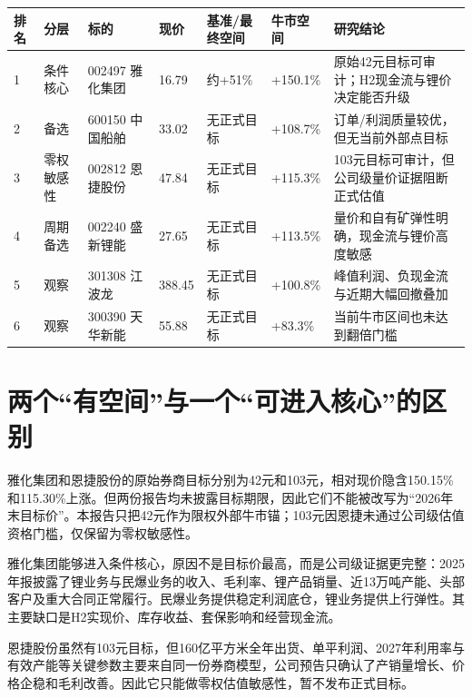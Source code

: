 \begin{exhibitbox}
\small
\begin{tabularx}{\exhibitboxwidth}{C{0.8cm} L{1.7cm} L{2.4cm} R{1.35cm} R{1.35cm} R{1.35cm} X}
\toprule
排名 & 分层 & 标的 & 现价 & 基准/最终空间 & 牛市空间 & 研究结论 \\
 & 条件核心 & 002497 雅化集团 & 16.79 & 约+51\% & +150.1\% & 原始42元目标可审计；H2现金流与锂价决定能否升级 \\
2 & 备选 & 600150 中国船舶 & 33.02 & 无正式目标 & +108.7\% & 订单/利润质量较优，但无当前外部点目标 \\
3 & 零权敏感性 & 002812 恩捷股份 & 47.84 & 无正式目标 & +115.3\% & 103元目标可审计，但公司级量价证据阻断正式估值 \\
4 & 周期备选 & 002240 盛新锂能 & 27.65 & 无正式目标 & +113.5\% & 量价和自有矿弹性明确，现金流与锂价高度敏感 \\
5 & 观察 & 301308 江波龙 & 388.45 & 无正式目标 & +100.8\% & 峰值利润、负现金流与近期大幅回撤叠加 \\
6 & 观察 & 300390 天华新能 & 55.88 & 无正式目标 & +83.3\% & 当前牛市区间也未达到翻倍门槛 \\
\bottomrule
\end{tabularx}
\end{exhibitbox}

\section{两个“有空间”与一个“可进入核心”的区别}

雅化集团和恩捷股份的原始券商目标分别为42元和103元，相对现价隐含150.15\%和115.30\%上涨。但两份报告均未披露目标期限，因此它们不能被改写为“2026年末目标价”。本报告只把42元作为限权外部牛市锚；103元因恩捷未通过公司级估值资格门槛，仅保留为零权敏感性。

雅化集团能够进入条件核心，原因不是目标价最高，而是公司级证据更完整：2025年报披露了锂业务与民爆业务的收入、毛利率、锂产品销量、近13万吨产能、头部客户及重大合同正常履行。民爆业务提供稳定利润底仓，锂业务提供上行弹性。其主要缺口是H2实现价、库存收益、套保影响和经营现金流。

恩捷股份虽然有103元目标，但160亿平方米全年出货、单平利润、2027年利用率与有效产能等关键参数主要来自同一份券商模型，公司预告只确认了产销量增长、价格企稳和毛利改善。因此它只能做零权估值敏感性，暂不发布正式目标。

